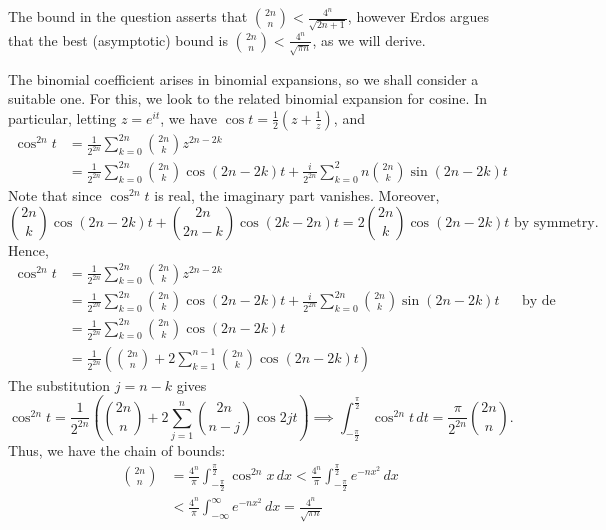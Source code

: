 \documentclass[../jarvis.tex]{subfiles}
\begin{document}
    The bound in the question asserts that $\binom{2n}{n} < \frac{4^n}{\sqrt{2n+1}}$, however Erdos argues that the best (asymptotic) bound is $\binom{2n}{n} < \frac{4^n}{\sqrt{\pi n}}$, as we will derive.
    
    The binomial coefficient arises in binomial expansions, so we shall consider a suitable one. For this, we look to the related binomial expansion for cosine. In particular, letting $z=e^{it}$, we have $\cos{t} = \frac{1}{2}\left(z+\frac{1}{z}\right)$, and \begin{align*}
        \cos^{2n} t &= \frac{1}{2^{2n}}\sum_{k=0}^{2n} \binom{2n}{k}z^{2n-2k} \\
        &= \frac{1}{2^{2n}}\sum_{k=0}^{2n} \binom{2n}{k}\cos{(2n-2k)t}+\frac{i}{2^{2n}}\sum_{k=0}^2n \binom{2n}{k}\sin{(2n-2k)t}
    \end{align*}
    Note that since $\cos^{2n}{t}$ is real, the imaginary part vanishes. Moreover, $$\binom{2n}{k}\cos{(2n-2k)t}+\binom{2n}{2n-k}\cos{(2k-2n)t}=2\binom{2n}{k}\cos{(2n-2k)t}\text{ by symmetry}.$$
    Hence,
    \begin{align*}
        \cos^{2n} t &= \frac{1}{2^{2n}}\sum_{k=0}^{2n} \binom{2n}{k}z^{2n-2k} \\
        &= \frac{1}{2^{2n}}\sum_{k=0}^{2n} \binom{2n}{k}\cos{(2n-2k)t}+\frac{i}{2^{2n}}\sum_{k=0}^{2n} \binom{2n}{k}\sin{(2n-2k)t} && \text{by de Moivre's theorem}\\
        &= \frac{1}{2^{2n}}\sum_{k=0}^{2n} \binom{2n}{k}\cos{(2n-2k)t} \\
        &= \frac{1}{2^{2n}}\left(\binom{2n}{n}+2\sum_{k=1}^{n-1}\binom{2n}{k}\cos{(2n-2k)t}\right)
    \end{align*}
    The substitution $j=n-k$ gives
    $$
        \cos^{2n} t = \frac{1}{2^{2n}}\left(\binom{2n}{n}+2\sum_{j=1}^{n}\binom{2n}{n-j}\cos{2jt}\right)
    \implies
        \int_{-\frac{\pi}{2}}^{\frac{\pi}{2}}\cos^{2n} t \,dt = \frac{\pi}{2^{2n}}\binom{2n}{n}.
    $$
    Thus, we have the chain of bounds:
    \begin{align}
        \binom{2n}{n}&=\frac{4^n}{\pi}\int_{-\frac{\pi}{2}}^{\frac{\pi}{2}}\cos^{2n}{x} \,dx < \frac{4^n}{\pi}\int_{-\frac{\pi}{2}}^{\frac{\pi}{2}}e^{-nx^2} \,dx \label{5.1-tangent-ineq}\\
        &< \frac{4^n}{\pi}\int_{-\infty}^{\infty}e^{-nx^2} \,dx = \frac{4^n}{\sqrt{\pi n}} \label{5.1-tangent-eq}
    \end{align}
\end{document}

